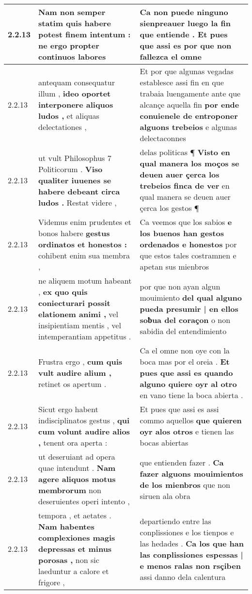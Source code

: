 \begin{tabular}{|p{1cm}|p{6.5cm}|p{6.5cm}|}
2.2.13 & Nam non semper statim \textbf{ quis habere potest finem intentum : } ne ergo propter continuos labores & Ca non puede ninguno \textbf{ sienpreauer luego la fin que entiende . } Et pues que assi es por que non fallezca el omne \\\hline
2.2.13 & antequam consequatur illum , \textbf{ ideo oportet interponere aliquos ludos , } et aliquas delectationes , & Et por que algunas vegadas establesce assi fin en que trabaia luengamente ante que alcançe aquella fin \textbf{ por ende conuienele de entroponer alguons trebeios } e algunas delectaconnes \\\hline
2.2.13 & ut vult Philosophus 7 Politicorum . \textbf{ Viso qualiter iuuenes se habere debeant circa ludos . } Restat videre , & delas politicas ¶ \textbf{ Visto en qual manera los moços se deuen auer çerca los trebeios finca de ver } en qual manera se deuen auer çerca los gestos ¶ \\\hline
2.2.13 & Videmus enim prudentes et bonos habere \textbf{ gestus ordinatos et honestos : } cohibent enim sua membra , & Ca veemos que los sabios \textbf{ e los buenos han gestos ordenados e honestos } por que estos tales costramnen e apetan sus mienbros \\\hline
2.2.13 & ne aliquem motum habeant , \textbf{ ex quo quis coniecturari possit elationem animi , } vel insipientiam mentis , vel intemperantiam appetitus . & por que non ayan algun mouimiento \textbf{ del qual alguno pueda presumir | en ellos soƀua del coraçon } o non sabidia del entendimiento \\\hline
2.2.13 & Frustra ergo , \textbf{ cum quis vult audire alium , } retinet os apertum . & Ca el omne non oye con la boca mas por el oreia . \textbf{ Et pues que assi es quando alguno quiere oyr al otro } en vano tiene la boca abierta . \\\hline
2.2.13 & Sicut ergo habent indisciplinatos gestus , \textbf{ qui cum volunt audire alios , } tenent ora aperta : & Et pues que assi es assi commo aquellos \textbf{ que quieren oyr alos otros } e tienen las bocas abiertas \\\hline
2.2.13 & ut deseruiant ad opera quae intendunt . \textbf{ Nam agere aliquos motus membrorum } non deseruientes operi intento , & que entienden fazer . \textbf{ Ca fazer alguons mouimientos de los mienbros } que non siruen ala obra \\\hline
2.2.13 & tempora , et aetates . \textbf{ Nam habentes complexiones magis depressas et minus porosas , } non sic laeduntur a calore et frigore , & departiendo entre las conplissiones e los tienpos e las hedades . \textbf{ Ca los que han las conplissiones espessas | e menos ralas non rsçiben } assi danno dela calentura \\\hline

\end{tabular}
